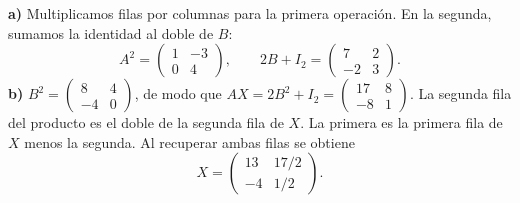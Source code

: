 \textbf{a)} Multiplicamos filas por columnas para la primera operación. En la segunda, sumamos la identidad al doble de $B$:
\[
A^2=\boxed{\begin{pmatrix}1&-3\\0&4\end{pmatrix}},
\qquad 2B+I_2=\boxed{\begin{pmatrix}7&2\\-2&3\end{pmatrix}}.
\]
\textbf{b)} $B^2=\begin{pmatrix}8&4\\-4&0\end{pmatrix}$, de modo que
$AX=2B^2+I_2=\begin{pmatrix}17&8\\-8&1\end{pmatrix}$.
La segunda fila del producto es el doble de la segunda fila de $X$. La primera es la primera fila de $X$ menos la segunda. Al recuperar ambas filas se obtiene
\[
X=\boxed{\begin{pmatrix}13&17/2\\-4&1/2\end{pmatrix}}.
\]
